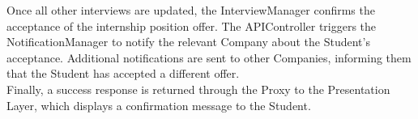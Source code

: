 Once all other interviews are updated, the InterviewManager confirms the acceptance of the internship position offer. The APIController triggers the NotificationManager to notify the relevant Company about the Student's acceptance. Additional notifications are sent to other Companies, informing them that the Student has accepted a different offer.\\
Finally, a success response is returned through the Proxy to the Presentation Layer, which displays a confirmation message to the Student.
